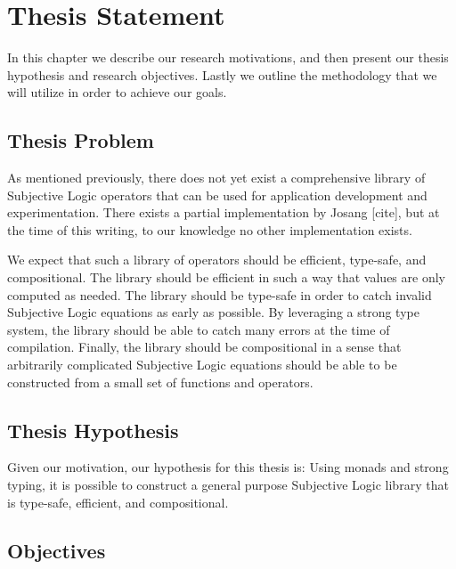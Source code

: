 \documentclass[thesis.tex]{subfiles}
\begin{document}
\chapter{Thesis Statement}
\label{chap:thesis-statement}

In this chapter we describe our research motivations, and then present our thesis hypothesis and
research objectives. Lastly we outline the methodology that we will utilize in order to
achieve our goals.


\section{Thesis Problem}

%
%

As mentioned previously, there does not yet exist a comprehensive library of Subjective
Logic operators that can be used for application development and experimentation. There
exists a partial implementation by Josang [cite], but at the time of this writing, to our
knowledge no other implementation exists.

We expect that such a library of operators should be efficient, type-safe, and compositional.
The library should be efficient in such a way that values are only computed as needed. The
library should be type-safe in order to catch invalid Subjective Logic equations as early as
possible. By leveraging a strong type system, the library should be able to catch many errors
at the time of compilation. Finally, the library should be compositional in a sense that
arbitrarily complicated Subjective Logic equations should be able to be constructed from a
small set of functions and operators.


\section{Thesis Hypothesis}

Given our motivation, our hypothesis for this thesis is: Using monads and strong typing, it is
possible to construct a general purpose Subjective Logic library that is type-safe, efficient,
and compositional.




%
%



\section{Objectives}
\end{document}
